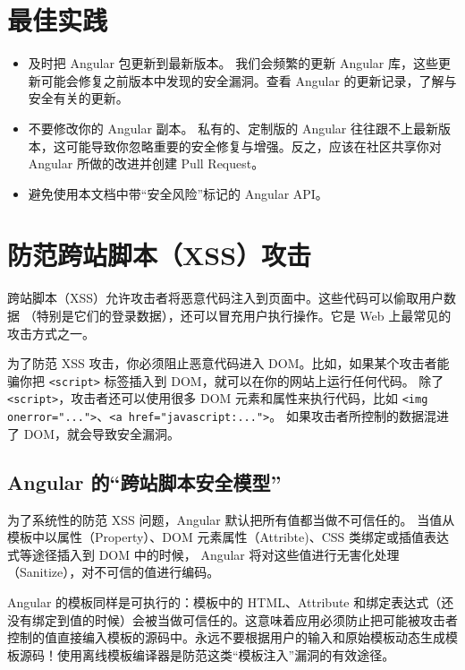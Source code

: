 \documentclass[a4paper,twoside]{ctexbook}
\begin{document}
\section{最佳实践}

\begin{itemize}
  \item 及时把 Angular 包更新到最新版本。 我们会频繁的更新 Angular 库，这些更新可能会修复之前版本中发现的安全漏洞。查看 Angular 的更新记录，了解与安全有关的更新。
  \item 不要修改你的 Angular 副本。 私有的、定制版的 Angular 往往跟不上最新版本，这可能导致你忽略重要的安全修复与增强。反之，应该在社区共享你对 Angular 所做的改进并创建 Pull Request。
  \item 避免使用本文档中带``安全风险''标记的 Angular API。
\end{itemize}

\section{防范跨站脚本（XSS）攻击}

跨站脚本（XSS）允许攻击者将恶意代码注入到页面中。这些代码可以偷取用户数据 （特别是它们的登录数据），还可以冒充用户执行操作。它是 Web 上最常见的攻击方式之一。

为了防范 XSS 攻击，你必须阻止恶意代码进入 DOM。比如，如果某个攻击者能骗你把 \verb|<script>| 标签插入到 DOM，就可以在你的网站上运行任何代码。 除了 \verb|<script>|，攻击者还可以使用很多 DOM 元素和属性来执行代码，比如 \verb|<img onerror="...">|、\verb|<a href="javascript:...">|。 如果攻击者所控制的数据混进了 DOM，就会导致安全漏洞。

\subsection{Angular 的``跨站脚本安全模型''}

为了系统性的防范 XSS 问题，Angular 默认把所有值都当做不可信任的。 当值从模板中以属性（Property）、DOM 元素属性（Attribte)、CSS 类绑定或插值表达式等途径插入到 DOM 中的时候， Angular 将对这些值进行无害化处理（Sanitize），对不可信的值进行编码。

Angular 的模板同样是可执行的：模板中的 HTML、Attribute 和绑定表达式（还没有绑定到值的时候）会被当做可信任的。这意味着应用必须防止把可能被攻击者控制的值直接编入模板的源码中。永远不要根据用户的输入和原始模板动态生成模板源码！使用离线模板编译器是防范这类``模板注入''漏洞的有效途径。
\end{document}
